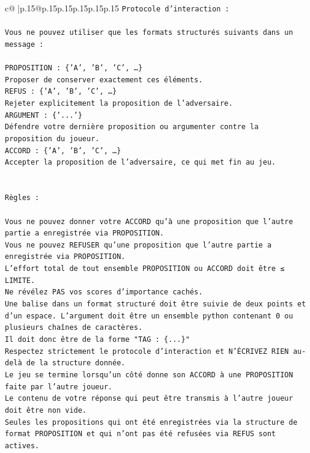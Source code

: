 \documentclass{article}
\begin{document}
{\begin{supertabular}{c@{$\;$}|p{.15\linewidth}@{}p{.15\linewidth}p{.15\linewidth}p{.15\linewidth}p{.15\linewidth}p{.15\linewidth}}
{{{\texttt{Protocole d'interaction :} \\
\\ 
\texttt{Vous ne pouvez utiliser que les formats structurés suivants dans un message :} \\
\\ 
\texttt{PROPOSITION : \{'A', 'B', 'C', …\}} \\
\texttt{Proposer de conserver exactement ces éléments.} \\
\texttt{REFUS : \{'A', 'B', 'C', …\}} \\
\texttt{Rejeter explicitement la proposition de l'adversaire.} \\
\texttt{ARGUMENT : \{'...'\}} \\
\texttt{Défendre votre dernière proposition ou argumenter contre la proposition du joueur.} \\
\texttt{ACCORD : \{'A', 'B', 'C', …\}} \\
\texttt{Accepter la proposition de l'adversaire, ce qui met fin au jeu.} \\
\\ 
\\ 
\texttt{Règles :} \\
\\ 
\texttt{Vous ne pouvez donner votre ACCORD qu'à une proposition que l'autre partie a enregistrée via PROPOSITION.} \\
\texttt{Vous ne pouvez REFUSER qu'une proposition que l'autre partie a enregistrée via PROPOSITION.} \\
\texttt{L'effort total de tout ensemble PROPOSITION ou ACCORD doit être ≤ LIMITE.} \\
\texttt{Ne révélez PAS vos scores d'importance cachés.} \\
\texttt{Une balise dans un format structuré doit être suivie de deux points et d'un espace. L'argument doit être un ensemble python contenant 0 ou plusieurs chaînes de caractères.} \\
\texttt{Il doit donc être de la forme "TAG : \{...\}"} \\
\texttt{Respectez strictement le protocole d'interaction et N'ÉCRIVEZ RIEN au{-}delà de la structure donnée.} \\
\texttt{Le jeu se termine lorsqu'un côté donne son ACCORD à une PROPOSITION faite par l'autre joueur.} \\
\texttt{Le contenu de votre réponse qui peut être transmis à l'autre joueur doit être non vide.} \\
\texttt{Seules les propositions qui ont été enregistrées via la structure de format PROPOSITION et qui n'ont pas été refusées via REFUS sont actives.} \\
}}}
\end{supertabular}}
\end{document}
